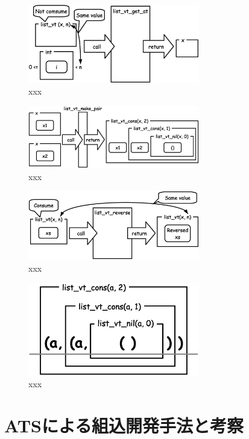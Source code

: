 \documentclass{ipsjprosym}
\begin{document}
\begin{figure}[h]
\centering
\includegraphics[width=75mm]{draw/list_vt_get_at.eps}
\caption{xxx}
\label{fig:xxx}
\end{figure}

\begin{figure}[h]
\centering
\includegraphics[width=75mm]{draw/list_vt_make_pair.eps}
\caption{xxx}
\label{fig:xxx}
\end{figure}

\begin{figure}[h]
\centering
\includegraphics[width=75mm]{draw/list_vt_reverse.eps}
\caption{xxx}
\label{fig:xxx}
\end{figure}

\begin{figure}[h]
\centering
\includegraphics[width=75mm]{draw/list_vt_type.eps}
\caption{xxx}
\label{fig:xxx}
\end{figure}

\section{ATSによる組込開発手法と考察}
\end{document}
